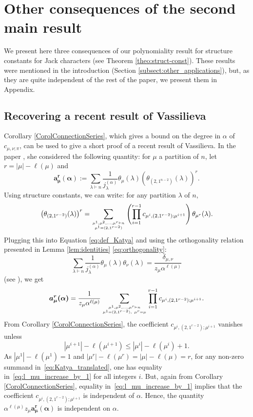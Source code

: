 \documentclass[11pt]{amsart}
\theoremstyle{plain}
\theoremstyle{remark}
\begin{document}
\section{Other consequences of the second main result}
\label{app:Matching-Jack_And_Matsumoto}
We present here three consequences of our polynomiality result
for structure constants for Jack characters (see Theorem \ref{theo:struct-const}).
These results were mentioned in the introduction 
(Section \ref{subsect:other_applications}),
but, as they are quite independent of the rest of the paper,
we present them in Appendix.

\subsection{Recovering a recent result of Vassilieva}
\label{sect:Recovering_Katya}
Corollary \ref{CorolConnectionSeries},
which gives a bound on the degree in $\alpha$ of $c_{\mu,\nu;\pi}$,
can be used to give a short proof of a recent result 
of Vassilieva.
In the paper \cite{VassilievaJack}, she considered the following quantity:
for $\mu$ a partition of $n$, let $r=|\mu|-\ell(\mu)$ and
\begin{equation}
    \label{eq:def_Katya}
\bm{a^r_\mu(\alpha)} := \sum_{\lambda \vdash n} \frac{1}{j_\lambda^{(\alpha)}} 
\theta_\mu(\lambda) \left(\theta_{(2,1^{n-2})}(\lambda)\right)^r.
\end{equation}
Using structure constants, we can write: for any partition $\lambda$ of $n$,
\[\left(\theta_{(2,1^{r-2})}(\lambda)\right)^r
=\sum_{\mu^1,\mu^2,\ldots,\mu^r \vdash n \atop \mu^1=(2,1^{r-2})}
\left(\prod_{i=1}^{r-1} c_{\mu^i,(2,1^{r-2});\mu^{i+1}}\right) \theta_{\mu^r}(\lambda).\]
Plugging this into Equation \eqref{eq:def_Katya} and using the orthogonality relation presented in Lemma \ref{lem:identities} \eqref{eq:orthogonality}:
\[\sum_{\lambda \vdash n} \frac{1}{j_\lambda^{(\alpha)}} 
\theta_\mu(\lambda) \theta_\nu(\lambda)
=\frac{\delta_{\mu,\nu}}{z_\mu \alpha^{\ell(\mu)}}\]
(see \cite[Section 3.3]{VassilievaJack}),
we get
\begin{equation}
    \label{eq:Katya_translated}
    \bm{a^r_\mu(\alpha)} = \frac{1}{z_\mu \alpha^{\ell(\mu)}}
\sum_{\mu^1,\mu^2,\ldots,\mu^r \vdash n \atop \mu^1=(2,1^{r-2}), \ \mu^r=\mu}
\prod_{i=1}^{r-1} c_{\mu^i,(2,1^{r-2});\mu^{i+1}}.
\end{equation}
From Corollary \ref{CorolConnectionSeries},
the coefficient $c_{\mu^i,(2,1^{r-2});\mu^{i+1}}$ vanishes unless
\begin{equation}\label{eq:l_mu_increase_by_1}
    |\mu^{i+1}| -\ell(\mu^{i+1}) \le |\mu^i| -\ell(\mu^i) + 1.
\end{equation}
As $|\mu^1|-\ell(\mu^1)=1$ and $|\mu^r|-\ell(\mu^r)=|\mu| - \ell(\mu) = r$,
for any non-zero summand in~\eqref{eq:Katya_translated},
one has equality in~\eqref{eq:l_mu_increase_by_1} for all integers $i$.
But, again from Corollary \ref{CorolConnectionSeries},
equality in~\eqref{eq:l_mu_increase_by_1} implies that the
coefficient $c_{\mu^i,(2,1^{r-2});\mu^{i+1}}$ is independent of $\alpha$.
Hence, the quantity $\alpha^{\ell(\mu)} z_\mu \bm{a^r_\mu(\alpha)}$ is independent on $\alpha$.
\end{document}
